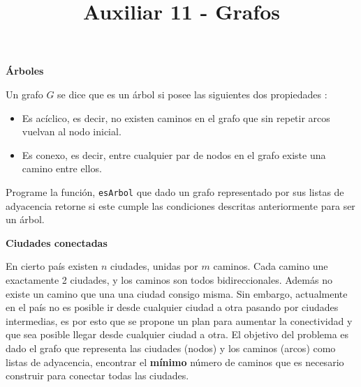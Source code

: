 \documentclass[dcc,sol]{fcfmcourse}
\title{Auxiliar 11 - Grafos}
\begin{document}
\maketitle

\vspace{-1ex}


\begin{problems}
\problem \textbf{Árboles}

Un grafo $G$ se dice que es un árbol si posee las siguientes dos propiedades :
\begin{itemize}
    \item Es acíclico, es decir, no existen caminos en el grafo que sin repetir arcos vuelvan al nodo inicial.
    \item Es conexo, es decir, entre cualquier par de nodos en el grafo existe una camino entre ellos.
\end{itemize}
Programe la función, \texttt{esArbol} que dado un grafo representado por sus listas de adyacencia retorne si este cumple las condiciones descritas anteriormente para ser un árbol.



\problem \textbf{Ciudades conectadas}

En cierto país existen $n$ ciudades, unidas por $m$ caminos. Cada camino une exactamente 2 ciudades, y los caminos son todos bidireccionales. Además no existe un camino que una una ciudad consigo misma. Sin embargo, actualmente en el país no es posible ir desde cualquier ciudad a otra pasando por ciudades intermedias, es por esto que se propone un plan para aumentar la conectividad y que sea posible llegar desde cualquier ciudad a otra. El objetivo del problema es dado el grafo que representa las ciudades (nodos) y los caminos (arcos) como listas de adyacencia, encontrar el \textbf{mínimo} número de caminos que es necesario construir para conectar todas las ciudades.

\end{problems}
\end{document}
